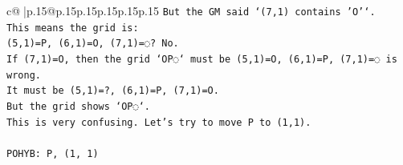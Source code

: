 \documentclass{article}
\begin{document}
{\begin{supertabular}{c@{$\;$}|p{.15\linewidth}@{}p{.15\linewidth}p{.15\linewidth}p{.15\linewidth}p{.15\linewidth}p{.15\linewidth}}
{{{\texttt{But the GM said `(7,1) contains 'O'`.} \\
\texttt{This means the grid is:} \\
\texttt{(5,1)=P, (6,1)=O, (7,1)=◌? No.} \\
\texttt{If (7,1)=O, then the grid `OP◌` must be (5,1)=O, (6,1)=P, (7,1)=◌ is wrong.} \\
\texttt{It must be (5,1)=?, (6,1)=P, (7,1)=O.} \\
\texttt{But the grid shows `OP◌`.} \\
\texttt{This is very confusing. Let's try to move P to (1,1).} \\
\\ 
\texttt{POHYB: P, (1, 1)} \\
            }
        }
    }
     \\ \\


\end{supertabular}}
\end{document}
